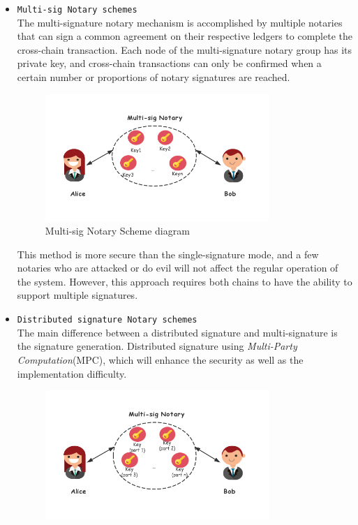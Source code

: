 \begin{itemize}
\begin{itemize}
        \item \texttt{Multi-sig Notary schemes}\\
       The multi-signature notary mechanism is accomplished by multiple notaries that can sign a common agreement on their respective ledgers to complete the cross-chain transaction. Each node of the multi-signature notary group has its private key, and cross-chain transactions can only be confirmed when a certain number or proportions of notary signatures are reached.

        \begin{figure}[H]
        \includegraphics[width=0.8\textwidth]{./figures/mnotary.png}
        \centering
        \caption{Multi-sig Notary Scheme diagram}%
        \centering
        \label{fig:mno}
        \end{figure}
       This method is more secure than the single-signature mode, and a few notaries who are attacked or do evil will not affect the regular operation of the system. However, this approach requires both chains to have the ability to support multiple signatures.
        \item  \texttt{Distributed signature Notary schemes} \\
        The main difference between a distributed signature and multi-signature is the signature generation. Distributed signature using \textit{Multi-Party Computation}(MPC), which will enhance the security as well as the implementation difficulty.
        \begin{figure}[H]
        \includegraphics[width=0.8\textwidth]{./figures/dnotary.png}

\end{figure}
\end{itemize}
\end{itemize}

